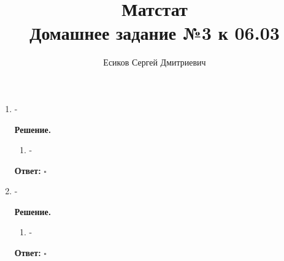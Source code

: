 \documentclass[12pt]{article}
\title{\textbf{Матстат}\\Домашнее задание №3 к 06.03}
\author{Есиков Сергей Дмитриевич}
\newenvironment{solution}{\textbf{Решение.}\par}{\hfill\(\square\)}
\newcommand{\answer}[1]{\textbf{Ответ:} \boxed{#1}}
\begin{document}
\maketitle

\begin{enumerate}[label=\textbf{\arabic*.}, left=0pt]
    \item -
          
    \begin{solution}
              \begin{enumerate}
                  \item -
              \end{enumerate}
              \answer{-}
          \end{solution}
    
    \item -
          
    \begin{solution}
              \begin{enumerate}
                  \item -
              \end{enumerate}
              \answer{-}
          \end{solution}
\end{enumerate}
\end{document}
